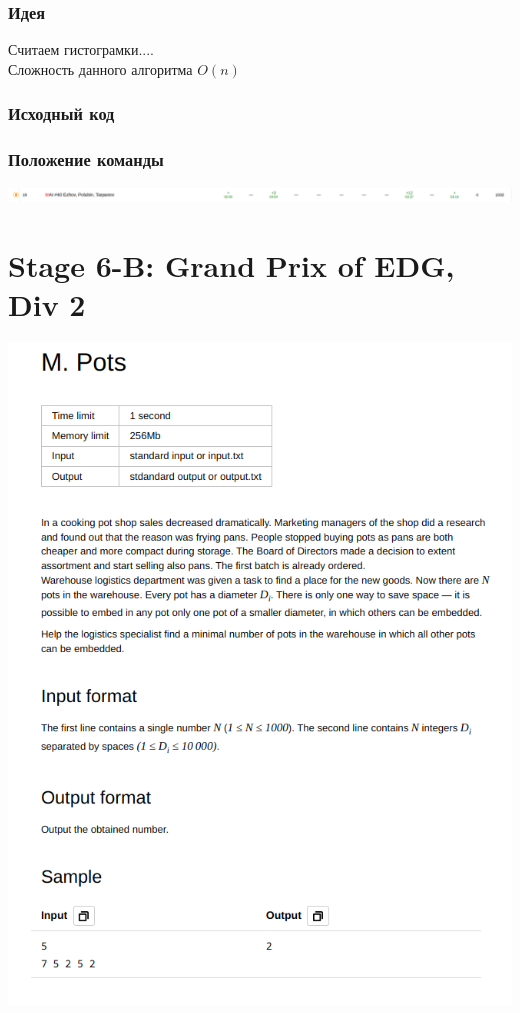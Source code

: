 \documentclass[12pt]{article}
\begin{document}
\subsubsection*{Идея}
Считаем гистограмки....
\\ 
Сложность данного алгоритма $O(n)$
\subsubsection*{Исходный код}

\subsubsection*{Положение команды}
\includegraphics[scale=0.5]{images/4.png}\newline\noindent

\pagebreak
\section{Stage 6-B: Grand Prix of EDG, Div 2}
\includegraphics[scale=0.75]{statements/6_M.png}
\end{document}
